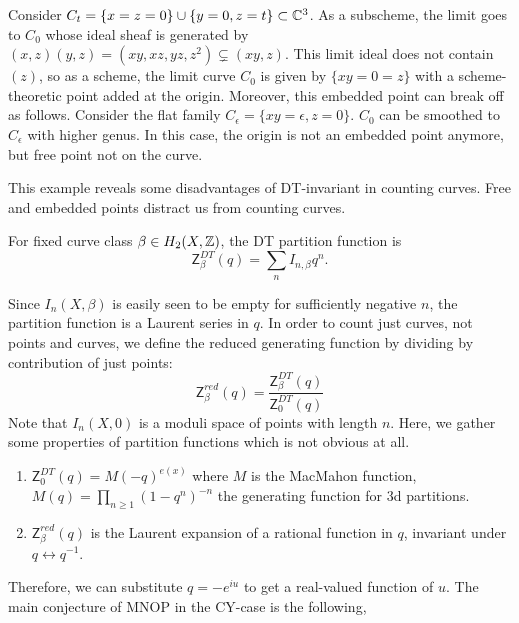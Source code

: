 \begin{eg}\label{DTex}
    Consider $C_t=\{x=z=0\} \cup \{y=0,z=t\} \subset \mathbb C^3$. As a subscheme, the limit goes to $C_0$ whose ideal sheaf is generated by $(x,z)(y,z)=(xy,xz,yz,z^2) \varsubsetneq (xy,z)$. This limit ideal does not contain $(z)$, so as a scheme, the limit curve $C_0$ is given by $\{xy=0=z\}$ with a scheme-theoretic point added at the origin. Moreover, this embedded point can break off as follows. Consider the flat family $C_{\epsilon}=\{xy=\epsilon, z=0\}$. $C_0$ can be smoothed to $C_\epsilon$ with higher genus. In this case, the origin is not an embedded point anymore, but free point not on the curve. 
\end{eg}
This example reveals some disadvantages of DT-invariant in counting curves. Free and embedded points distract us from counting curves. 
\begin{defin}
    For fixed curve class $\beta \in H_2(X, \mathbb Z)$, the DT partition function is
    \begin{equation*}
        \mathsf{Z}^{DT}_{\beta}(q)=\sum_n I_{n,\beta}q^n.
    \end{equation*}
\end{defin}
Since $I_n(X, \beta)$ is easily seen to be empty for sufficiently negative $n$, the partition function is a Laurent series in $q$. In order to count just curves, not points and curves, we define the reduced generating function by dividing by contribution of just points:
\begin{equation*}
    \mathsf{Z}^{red}_{\beta}(q)=\frac{\mathsf{Z}^{DT}_{\beta}(q)}{\mathsf{Z}^{DT}_0(q)}
\end{equation*}
Note that $I_n(X, 0)$ is a moduli space of points with length $n$. Here, we gather some properties of partition functions which is not obvious at all.
\begin{prop}
    \begin{enumerate}
        \item $\mathsf{Z}^{DT}_{0}(q)=M(-q)^{e(x)}$ where $M$ is the MacMahon function, \\
        $M(q)= \prod_{n \geq 1}(1-q^n)^{-n}$ the generating function for 3d partitions. 
        \item $\mathsf{Z}^{red}_{\beta}(q)$ is the Laurent expansion of a rational function in $q$, invariant under $q \leftrightarrow q^{-1}$. 
    \end{enumerate}
\end{prop}
Therefore, we can substitute $q=-e^{iu}$ to get a real-valued function of $u$. The main conjecture of MNOP in the CY-case is the following,

